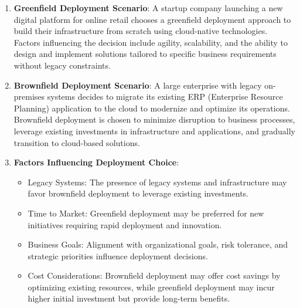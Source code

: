 \documentclass[11pt]{article}
\begin{document}
\begin{enumerate}
    \item \textbf{Greenfield Deployment Scenario}: A startup company launching a new digital platform for online retail chooses a greenfield deployment approach to build their infrastructure from scratch using cloud-native technologies. Factors influencing the decision include agility, scalability, and the ability to design and implement solutions tailored to specific business requirements without legacy constraints.

    \item \textbf{Brownfield Deployment Scenario}: A large enterprise with legacy on-premises systems decides to migrate its existing ERP (Enterprise Resource Planning) application to the cloud to modernize and optimize its operations. Brownfield deployment is chosen to minimize disruption to business processes, leverage existing investments in infrastructure and applications, and gradually transition to cloud-based solutions.

    \item \textbf{Factors Influencing Deployment Choice}:
          \begin{itemize}
              \item Legacy Systems: The presence of legacy systems and infrastructure may favor brownfield deployment to leverage existing investments.
              \item Time to Market: Greenfield deployment may be preferred for new initiatives requiring rapid deployment and innovation.
              \item Business Goals: Alignment with organizational goals, risk tolerance, and strategic priorities influence deployment decisions.
              \item Cost Considerations: Brownfield deployment may offer cost savings by optimizing existing resources, while greenfield deployment may incur higher initial investment but provide long-term benefits.
          \end{itemize}
\end{enumerate}
\end{document}
